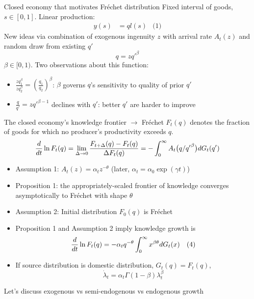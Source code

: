 \documentclass[10pt,notes=hide]{beamer}
\begin{document}
\begin{frame}{Closed economy that motivates Fr\'{e}chet distribution}
Fixed interval of goods, $s\in[0,1]$. Linear production:
\begin{align*}
y(s) &= q l(s)
& \text{(1)}
\end{align*}
New ideas via combination of exogenous ingenuity $z$ with arrival rate $A_{t}\left(z\right)$ and random draw from existing $q'$
$$
q = z q'^{\beta}
$$
$\beta \in [0,1)$.
Two observations about this function:
\begin{itemize}
\item $\frac{z q_{1}^{\beta}}{z q_{2}^{\beta}} = \left(\frac{q_{1}}{q_{2}}\right)^{\beta}$:
	$\beta$ governs $q$'s sensitivity to quality of prior $q'$
\item $\frac{q}{q'} = z q'^{\beta-1}$ declines with $q'$: better $q'$ are harder to improve 
\end{itemize}
\end{frame}
\begin{frame}{The closed economy's knowledge frontier $\to$ Fr\'{e}chet}
$F_t(q)$ denotes the fraction of goods for which no producer's productivity exceeds $q$.
\begin{equation*}
{d \over dt} \ln F_t(q) = \lim_{\Delta \rightarrow 0} {F_{t+\Delta}(q) - F_t(q) \over \Delta F_t(q) } = - \int_0^\infty A_t\big(q/{q'}^\beta\big) d G_t(q')
\end{equation*}
\begin{itemize}
\item Assumption 1: 
$ A_t(z) = \alpha_{t} z^{-\theta} $
(later, $\alpha_{t} = \alpha_{0}\exp(\gamma t)$)
\item Proposition 1:
the appropriately-scaled frontier of knowledge converges asymptotically to Fr\'{e}chet with shape $\theta$
\item Assumption 2: Initial distribution $F_{0}(q)$ is Fr\'{e}chet
\item Proposition 1 and Assumption 2 imply knowledge growth is
\begin{align*}
{d \over dt} \ln F_t(q) 
&=
-\alpha_t q^{-\theta} \int_0^\infty x^{\beta\theta} d G_t(x)
& \text{(4)}
\end{align*}
\item If source distribution is domestic distribution, $G_{t}(q) = F_{t}(q)$,
$$\dot{\lambda}_{t} = \alpha_{t} \Gamma\left(1-\beta\right)\lambda_{t}^{\beta}$$
\end{itemize}
Let's discuss exogenous vs semi-endogenous vs endogenous growth
\end{frame}
\end{document}
